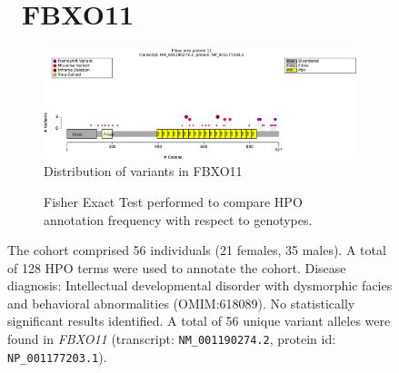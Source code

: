 \begin{figure}[htbp]
\section*{ FBXO11}
\centering
\begin{subfigure}[b]{0.95\textwidth}
\centering
\includegraphics[width=\textwidth]{ img/FBXO11_protein_diagram.pdf} 
\captionsetup{justification=raggedright,singlelinecheck=false}
\caption{Distribution of variants in FBXO11}
\end{subfigure}

\vspace{2em}

\begin{subfigure}[b]{0.95\textwidth}
\centering
{}
\captionsetup{justification=raggedright,singlelinecheck=false}
\caption{Fisher Exact Test performed to compare HPO annotation frequency with respect to genotypes.}
\end{subfigure}

\vspace{2em}

\caption{The cohort comprised 56 individuals (21 females, 35 males). A total of 128 HPO terms were used to annotate the cohort. Disease diagnosis: Intellectual developmental disorder with dysmorphic facies and behavioral abnormalities (OMIM:618089). No statistically significant results identified. A total of 56 unique variant alleles were found in \textit{FBXO11} (transcript: \texttt{NM\_001190274.2}, protein id: \texttt{NP\_001177203.1}).}
\end{figure}
